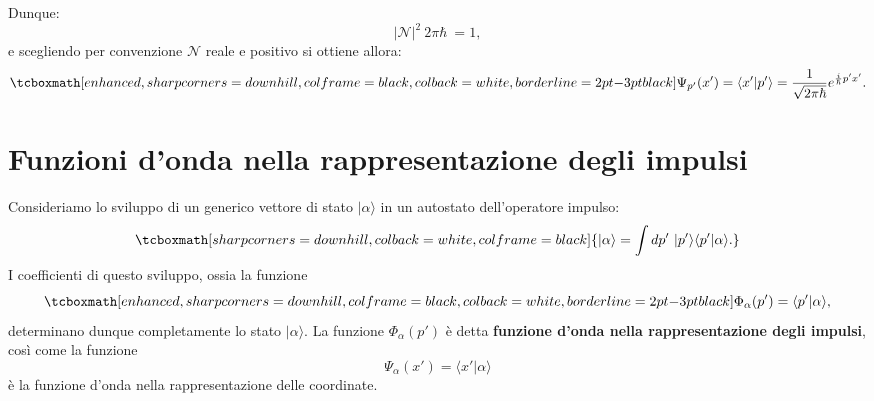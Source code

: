 \documentclass[a4paper,12pt,oneside]{book}
\begin{document}
Dunque:
	\begin{equation}
		\vert\mathcal{N} \vert ^2\ 2 \pi \hbar\ =1,
	\end{equation}
e scegliendo per convenzione $\mathcal{N}$ reale e positivo si ottiene allora:
	\begin{equation}
		\tcboxmath[enhanced, sharp corners=downhill, colframe=black, colback=white, borderline={2pt}{-3pt}{black}]{
			\Psi_{p'}(x') = \langle x' | p' \rangle = \frac{1}{\sqrt{2 \pi \hbar}} e^{\frac{i}{\hbar}p'x'}.
			}
	\end{equation}

\section[Funzioni d'onda nella rappresentazione degli impulsi]{Funzioni d'onda nella rappresentazione degli impulsi}
Consideriamo lo sviluppo di un generico vettore di stato $| \alpha \rangle$ in un autostato dell'operatore impulso:
	\begin{equation}
		\tcboxmath[sharp corners=downhill, colback=white, colframe=black]{
			| \alpha \rangle = \int dp' ~ | p' \rangle \langle p' | \alpha \rangle.
		}	
	\end{equation}
I coefficienti di questo sviluppo, ossia la funzione
	\begin{equation}
		\tcboxmath[enhanced, sharp corners=downhill, colframe=black, colback=white, borderline={2pt}{-3pt}{black}]{
			\Phi_\alpha (p') =  \langle p' | \alpha \rangle,
			}
	\end{equation}
determinano dunque completamente lo stato $| \alpha \rangle$. La funzione $\Phi_\alpha (p')$ è detta \textbf{funzione d'onda nella rappresentazione degli impulsi}, così come la funzione
	\begin{equation}
		\Psi_\alpha (x') =  \langle x' | \alpha \rangle
	\end{equation}
è la funzione d'onda nella rappresentazione delle coordinate.\\
\end{document}
